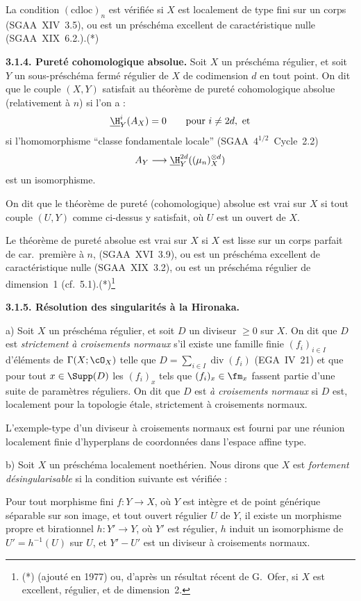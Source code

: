 La condition $(\mathrm{cdloc})_n$ est vérifiée si $X$ est localement de type fini sur un corps (SGAA~XIV~3.5), ou est un préschéma excellent de caractéristique nulle (SGAA~XIX~6.2.).(*)

\textbf{3.1.4. Pureté cohomologique absolue.} Soit $X$ un préschéma régulier, et soit $Y$ un sous-préschéma fermé régulier de $X$ de codimension $d$ en tout point. On dit que le couple $(X,Y)$ satisfait au théorème de pureté cohomologique absolue (relativement à $n$) si l'on a :
\[
\underline{\H}^i_Y(A_X) = 0 \qquad \text{pour } i \neq 2d, \text{ et}
\]
si l'homomorphisme ``classe fondamentale locale'' (SGAA~$4^{1/2}$~Cycle~2.2)
\[
A_Y \longrightarrow \underline{\H}^{2d}_Y((\mu_n)^{\otimes d}_X)
\]
est un isomorphisme.

On dit que le théorème de pureté (cohomologique) absolue est vrai sur $X$ si tout couple $(U,Y)$ comme ci-dessus y satisfait, où $U$ est un ouvert de $X$.

Le théorème de pureté absolue est vrai sur $X$ si $X$ est lisse sur un corps parfait de car.~première à $n$, (SGAA~XVI~3.9), ou est un préschéma excellent de caractéristique nulle (SGAA~XIX~3.2), ou est un préschéma régulier de dimension~1 (cf.~5.1).(*)\footnote{(*) (ajouté en 1977) ou, d'après un résultat récent de G.~Ofer, si $X$ est excellent, régulier, et de dimension~2.}

\textbf{3.1.5. Résolution des singularités à la Hironaka.}

a) Soit $X$ un préschéma régulier, et soit $D$ un diviseur $\geqslant 0$ sur $X$. On dit que $D$ est \emph{strictement à croisements normaux} s'il existe une famille finie $(f_i)_{i \in I}$ d'éléments de $\Gamma(X; \cO_X)$ telle que $D = \sum_{i \in I} \operatorname{div}(f_i)$ (EGA~IV~21) et que pour tout $x \in \Supp(D)$ les $(f_i)_x$ tels que $(f_i)_x \in \fm_x$ fassent partie d'une suite de paramètres réguliers. On dit que $D$ est \emph{à croisements normaux} si $D$ est, localement pour la topologie étale, strictement à croisements normaux.

L'exemple-type d'un diviseur à croisements normaux est fourni par une réunion localement finie d'hyperplans de coordonnées dans l'espace affine type.

b) Soit $X$ un préschéma localement noethérien. Nous dirons que $X$ est \emph{fortement désingularisable} si la condition suivante est vérifiée :

Pour tout morphisme fini $f : Y \to X$, où $Y$ est intègre et de point générique séparable sur son image, et tout ouvert régulier $U$ de $Y$, il existe un morphisme propre et birationnel $h : Y' \to Y$, où $Y'$ est régulier, $h$ induit un isomorphisme de $U' = h^{-1}(U)$ sur $U$, et $Y' - U'$ est un diviseur à croisements normaux.

